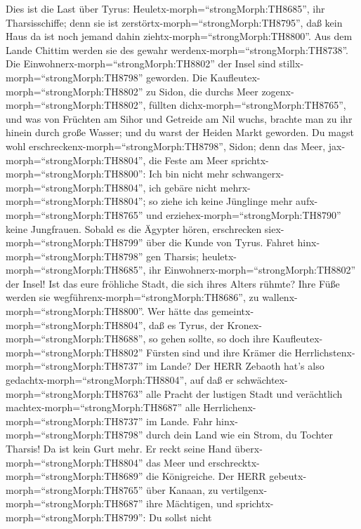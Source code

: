  Dies ist die Last über Tyrus:
Heuletx-morph=``strongMorph:TH8685'', ihr Tharsisschiffe; denn sie ist
zerstörtx-morph=``strongMorph:TH8795'', daß kein Haus da ist noch jemand
dahin ziehtx-morph=``strongMorph:TH8800''. Aus dem Lande Chittim werden
sie des gewahr werdenx-morph=``strongMorph:TH8738''.  Die
Einwohnerx-morph=``strongMorph:TH8802'' der Insel sind
stillx-morph=``strongMorph:TH8798'' geworden. Die
Kaufleutex-morph=``strongMorph:TH8802'' zu Sidon, die durchs Meer
zogenx-morph=``strongMorph:TH8802'', füllten
dichx-morph=``strongMorph:TH8765'',  und was von Früchten am
Sihor und Getreide am Nil wuchs, brachte man zu ihr hinein durch große
Wasser; und du warst der Heiden Markt geworden.  Du magst
wohl erschreckenx-morph=``strongMorph:TH8798'', Sidon; denn das Meer,
jax-morph=``strongMorph:TH8804'', die Feste am Meer
sprichtx-morph=``strongMorph:TH8800'': Ich bin nicht mehr
schwangerx-morph=``strongMorph:TH8804'', ich gebäre nicht
mehrx-morph=``strongMorph:TH8804''; so ziehe ich keine Jünglinge mehr
aufx-morph=``strongMorph:TH8765'' und
erziehex-morph=``strongMorph:TH8790'' keine Jungfrauen. 
Sobald es die Ägypter hören, erschrecken
siex-morph=``strongMorph:TH8799'' über die Kunde von Tyrus. 
Fahret hinx-morph=``strongMorph:TH8798'' gen Tharsis;
heuletx-morph=``strongMorph:TH8685'', ihr
Einwohnerx-morph=``strongMorph:TH8802'' der Insel!  Ist das
eure fröhliche Stadt, die sich ihres Alters rühmte? Ihre Füße werden sie
wegführenx-morph=``strongMorph:TH8686'', zu
wallenx-morph=``strongMorph:TH8800''.  Wer hätte das
gemeintx-morph=``strongMorph:TH8804'', daß es Tyrus, der
Kronex-morph=``strongMorph:TH8688'', so gehen sollte, so doch ihre
Kaufleutex-morph=``strongMorph:TH8802'' Fürsten sind und ihre Krämer die
Herrlichstenx-morph=``strongMorph:TH8737'' im Lande?  Der
HERR Zebaoth hat's also gedachtx-morph=``strongMorph:TH8804'', auf daß
er schwächtex-morph=``strongMorph:TH8763'' alle Pracht der lustigen
Stadt und verächtlich machtex-morph=``strongMorph:TH8687'' alle
Herrlichenx-morph=``strongMorph:TH8737'' im Lande.  Fahr
hinx-morph=``strongMorph:TH8798'' durch dein Land wie ein Strom, du
Tochter Tharsis! Da ist kein Gurt mehr.  Er reckt seine
Hand überx-morph=``strongMorph:TH8804'' das Meer und
erschrecktx-morph=``strongMorph:TH8689'' die Königreiche. Der HERR
gebeutx-morph=``strongMorph:TH8765'' über Kanaan, zu
vertilgenx-morph=``strongMorph:TH8687'' ihre Mächtigen, 
und sprichtx-morph=``strongMorph:TH8799'': Du sollst nicht
